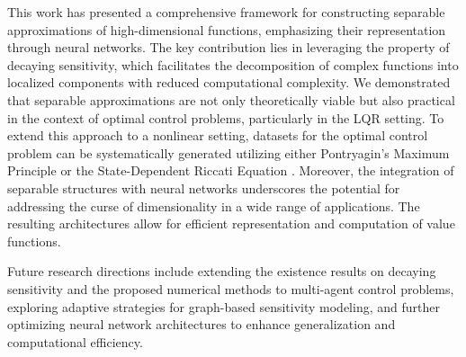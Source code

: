 \documentclass{article}
\begin{document}
This work has presented a comprehensive framework for constructing separable approximations of high-dimensional functions, emphasizing their representation through neural networks. The key contribution lies in leveraging the property of decaying sensitivity, which facilitates the decomposition of complex functions into localized components with reduced computational complexity. We demonstrated that separable approximations are not only theoretically viable but also practical in the context of optimal control problems, particularly in the LQR setting. To extend this approach to a nonlinear setting, datasets for the optimal control problem can be systematically generated utilizing either Pontryagin's Maximum Principle \cite{azmi2021optimal} or the State-Dependent Riccati Equation \cite{albi2022,dolgov2022data}. Moreover, the integration of separable structures with neural networks underscores the potential for addressing the curse of dimensionality in a wide range of applications. The resulting architectures allow for efficient representation and computation of value functions.

Future research directions include extending the existence results on decaying sensitivity and the proposed numerical methods to multi-agent control problems, exploring adaptive strategies for graph-based sensitivity modeling, and further optimizing neural network architectures to enhance generalization and computational efficiency.


{
 
}
\end{document}
